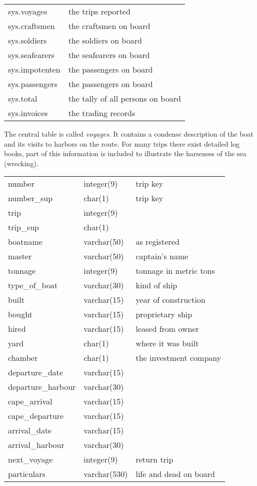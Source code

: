 \documentclass[10pt,twocolumn,fleqn]{article}
\begin{document}
{\footnotesize
\begin{tabular}{l l}
sys.voyages	& the trips reported\\
sys.craftsmen	& the craftsmen on board \\
sys.soldiers	& the soldiers on board \\
sys.seafearers	& the seafearers on board \\
sys.impotenten	& the passengers on board \\
sys.passengers	& the passengers on board \\
sys.total	& the tally of all persons on board\\
sys.invoices	& the trading records \\
\end{tabular}
}

The central table is called {\em voyages}. It contains
a condense description of the boat and its visits to
harbors on the route. 
For many trips there exist
detailed log books, part of this information is
included to illustrate the harseness of the sea (wrecking).

{\footnotesize
\begin{tabular}{l l l}
number	& integer(9)	& trip key\\
number\_sup	& char(1)	& trip key\\
trip	& integer(9)	&\\
trip\_sup	& char(1)	&\\
boatname	& varchar(50)	& as registered\\
master	& varchar(50)	& captain's name\\
tonnage	& integer(9)	& tonnage in metric tons\\
type\_of\_boat	& varchar(30)	& kind of ship\\
built	& varchar(15)	& year of construction\\
bought	& varchar(15)	& proprietary ship\\
hired	& varchar(15)	& leased from owner\\
yard	& char(1)	& where it was built\\
chamber	& char(1)	& the investment company\\
departure\_date	& varchar(15)	&\\
departure\_harbour	& varchar(30)	&\\
cape\_arrival	& varchar(15)	&\\
cape\_departure	& varchar(15)	&\\
arrival\_date	& varchar(15)	&\\
arrival\_harbour	& varchar(30)	&\\
next\_voyage	& integer(9)	& return trip\\
particulars	& varchar(530)	& life and dead on board\\
\end{tabular}
}
\end{document}
